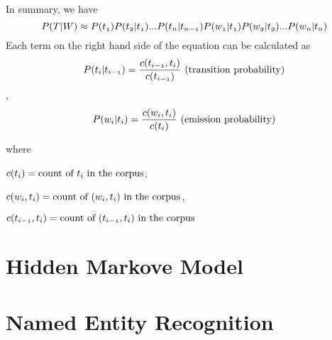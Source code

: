 \documentclass[12pt, oneside]{article}
\begin{document}
In summary, we have 
$$\mathnormal{P(T|W) \approx P(t_1) P(t_2|t_1) ... P(t_{n}|t_{n-1}) P(w_1|t_1) P(w_2|t_2) ... P(w_n|t_n)}$$
Each term on the right hand side of the equation can be calculated as 
$$\mathnormal{P(t_{i}|t_{i-1}) = \frac{c(t_{i-1},t_{i})}{c(t_{i-1})}} \text{ (transition probability)}$$ , 
$$\mathnormal{P(w_i|t_i) = \frac{c(w_i,t_i)}{c(t_i)}} \text{ (emission probability)}$$

where 

$\mathnormal{c(t_i)} = \text{count of } \mathnormal{t_i} \text{ in the corpus}$,  

$ \mathnormal{c(w_i,t_i)} = \text{count of }  \mathnormal{(w_i, t_i)} \text{ in the corpus}$,

$ \mathnormal{c(t_{i-1},t_{i})} = \text{count of }  \mathnormal{(t_{i-1}, t_i)} \text{ in the corpus}$

\section{Hidden Markove Model}

\section{Named Entity Recognition}
\end{document}
